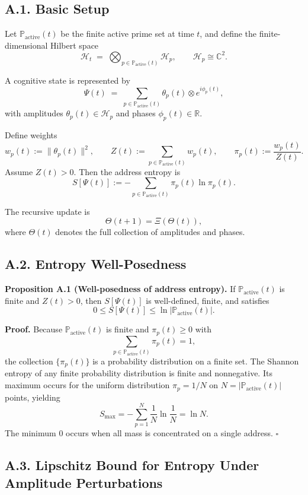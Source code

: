 \documentclass[11pt]{article}
\begin{document}
\subsection*{A.1. Basic Setup}

Let $\mathbb{P}_{\mathrm{active}}(t)$ be the finite active prime set at time $t$, and define the finite-dimensional Hilbert space
\[
\mathcal{H}_t \;=\; \bigotimes_{p \in \mathbb{P}_{\mathrm{active}}(t)} \mathcal{H}_p,
\qquad
\mathcal{H}_p \cong \mathbb{C}^2.
\]

A cognitive state is represented by
\[
\Psi(t) \;=\; \sum_{p \in \mathbb{P}_{\mathrm{active}}(t)} \theta_p(t)\otimes e^{i\phi_p(t)},
\]
with amplitudes $\theta_p(t)\in \mathcal{H}_p$ and phases $\phi_p(t)\in\mathbb{R}$. \cite{neuroplasticityMT}

Define weights
\[
w_p(t) := \|\theta_p(t)\|^2,
\qquad
Z(t) := \sum_{p\in\mathbb{P}_{\mathrm{active}}(t)} w_p(t),
\qquad
\pi_p(t) := \frac{w_p(t)}{Z(t)}.
\]
Assume $Z(t)>0$. Then the address entropy is
\[
S[\Psi(t)] := -\sum_{p\in\mathbb{P}_{\mathrm{active}}(t)} \pi_p(t)\ln \pi_p(t).
\]

The recursive update is
\[
\Theta(t+1)=\Xi(\Theta(t)),
\]
where $\Theta(t)$ denotes the full collection of amplitudes and phases. \cite{neuroplasticityMT}

\subsection*{A.2. Entropy Well-Posedness}

\textbf{Proposition A.1 (Well-posedness of address entropy).}
If $\mathbb{P}_{\mathrm{active}}(t)$ is finite and $Z(t)>0$, then $S[\Psi(t)]$ is well-defined, finite, and satisfies
\[
0 \le S[\Psi(t)] \le \ln |\mathbb{P}_{\mathrm{active}}(t)|.
\]

\textbf{Proof.}
Because $\mathbb{P}_{\mathrm{active}}(t)$ is finite and $\pi_p(t)\ge 0$ with
\[
\sum_{p\in\mathbb{P}_{\mathrm{active}}(t)} \pi_p(t)=1,
\]
the collection $\{\pi_p(t)\}$ is a probability distribution on a finite set. The Shannon entropy of any finite probability distribution is finite and nonnegative. Its maximum occurs for the uniform distribution $\pi_p = 1/N$ on $N=|\mathbb{P}_{\mathrm{active}}(t)|$ points, yielding
\[
S_{\max}=-\sum_{p=1}^N \frac{1}{N}\ln\frac{1}{N} = \ln N.
\]
The minimum $0$ occurs when all mass is concentrated on a single address. \hfill $\square$

\subsection*{A.3. Lipschitz Bound for Entropy Under Amplitude Perturbations}
\end{document}
